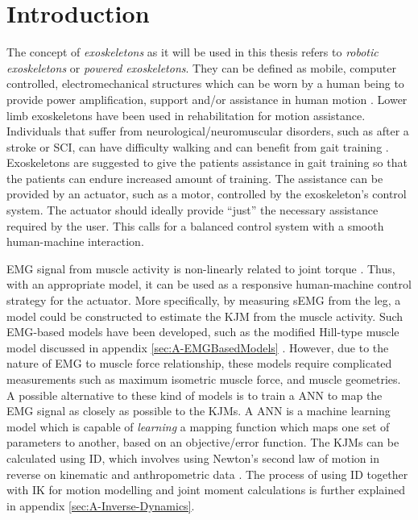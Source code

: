 \documentclass[../main.tex]{subfiles}
\begin{document}
\chapter{Introduction}
The concept of \textit{exoskeletons} as it will be used in this thesis refers to \textit{robotic exoskeletons} or \textit{powered exoskeletons}. 
They can be defined as mobile, computer controlled, electromechanical structures which can be worn by a human being to provide power amplification, support and/or assistance in human motion \cite{Anam2012, Gorgey2018}. 
Lower limb exoskeletons have been used in rehabilitation for motion assistance.
Individuals that suffer from neurological/neuromuscular disorders, such as after a stroke or \ac{SCI}, can have difficulty walking and can benefit from gait training \cite{Gorgey2018, Young2017, Lerner2017}.
Exoskeletons are suggested to give the patients assistance in gait training so that the patients can endure increased amount of training.
The assistance can be provided by an actuator, such as a motor, controlled by the exoskeleton's control system.
The actuator should ideally provide ``just'' the necessary assistance required by the user.
This calls for a balanced control system with a smooth human-machine interaction.

\Ac{EMG} signal from muscle activity is non-linearly related to joint torque \cite{Young2017}.
Thus, with an appropriate model, it can be used as a responsive human-machine control strategy for the actuator.
More specifically, by measuring \ac{sEMG} from the leg, a model could be constructed to estimate the \ac{KJM} from the muscle activity.
Such \ac{EMG}-based models have been developed, such as the modified Hill-type muscle model discussed in appendix \ref{sec:A-EMGBasedModels} \cite{Pizzolato2015, Erdemir2007, Lloyd2003}.
However, due to the nature of \ac{EMG} to muscle force relationship, these models require complicated measurements such as maximum isometric muscle force, and muscle geometries.
A possible alternative to these kind of models is to train a \ac{ANN} to map the \ac{EMG} signal as closely as possible to the \acp{KJM}.
A \ac{ANN} is a machine learning model which is capable of \textit{learning} a mapping function which maps one set of parameters to another, based on an objective/error function. 
The \acp{KJM} can be calculated using \ac{ID}, which involves using Newton's second law of motion in reverse on kinematic and anthropometric data \cite{inversedynamics}.
The process of using \ac{ID} together with \ac{IK} for motion modelling and joint moment calculations is further explained in appendix \ref{sec:A-Inverse-Dynamics}.
\end{document}

